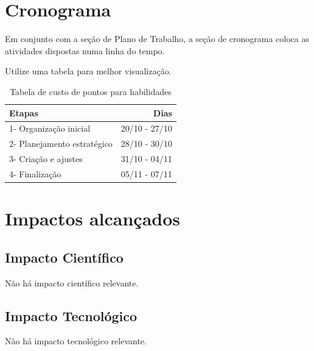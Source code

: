 \documentclass[a4paper,12pt]{article}  %
\begin{document}
\section{Cronograma}

   Em conjunto com a seção de Plano de Trabalho, a seção de cronograma coloca as atividades dispostas numa linha do tempo.


   Utilize uma tabela para melhor visualização.

\begin{table}[H]
\begin{center}
 \caption{Tabela de custo de pontos para habilidades}
\begin{tabular}{|l|r|}
  \hline \hline
  Etapas & Dias  \\ \hline 
  1- Organização inicial &  20/10 - 27/10  \\ \hline
  2- Planejamento estratégico & 28/10 - 30/10 \\ \hline
  3- Criação e ajustes  &  31/10 - 04/11 \\ \hline
  4- Finalização & 05/11 - 07/11 \\ \hline
\end{tabular} 
\end{center}
\end{table}


\section{Impactos alcançados } %

 \subsection{Impacto Científico}

 Não há impacto científico relevante.

 \subsection{Impacto Tecnológico}

  Não há impacto tecnológico relevante.
\end{document}
